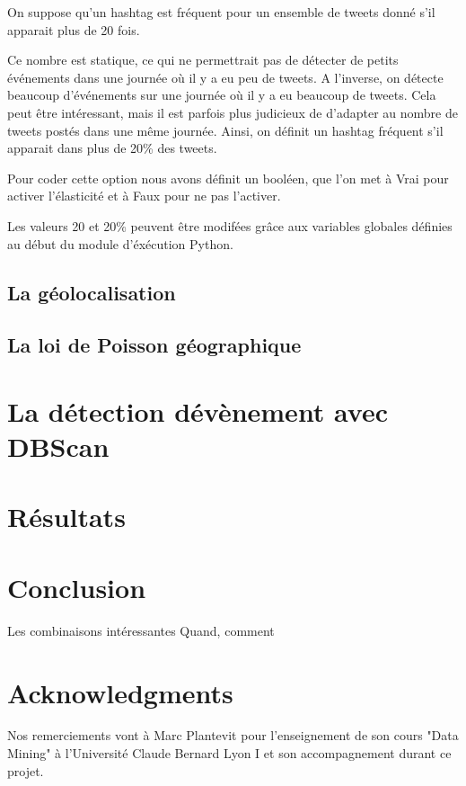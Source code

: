 \documentclass[12pt]{article}
\begin{document}
On suppose qu'un hashtag est fr\'equent pour un ensemble de tweets donn\'e s'il apparait
plus de 20 fois.

Ce nombre est statique, ce qui ne permettrait pas de d\'etecter de petits \'ev\'enements dans
une journ\'ee o\`u il y a eu peu de tweets. A l'inverse, on d\'etecte beaucoup d'\'ev\'enements sur
une journ\'ee o\`u il y a eu beaucoup de tweets.
Cela peut \^etre int\'eressant, mais il est parfois plus judicieux de d'adapter au nombre de
tweets post\'es dans une m\^eme journ\'ee. Ainsi, on d\'efinit un hashtag fr\'equent s'il apparait
dans plus de 20\% des tweets.

Pour coder cette option nous avons d\'efinit un bool\'een, que l'on met \`a Vrai pour activer
l'\'elasticit\'e et \`a Faux pour ne pas l'activer.

Les valeurs 20 et 20\% peuvent \^etre modif\'ees gr\^ace aux variables globales d\'efinies au d\'ebut du
module d'\'ex\'ecution Python.

\subsection{La g\'eolocalisation}


\subsection{La loi de Poisson g\'eographique}


\section{La d\'etection d\'ev\`enement avec DBScan}


\section{R\'esultats}



\section{Conclusion}
Les combinaisons int\'eressantes
\newline
Quand, comment


\section*{Acknowledgments}
Nos remerciements vont \`a Marc Plantevit pour l'enseignement de son cours "Data Mining" \`a l'Universit\'e Claude Bernard Lyon I et son accompagnement durant ce projet.






\appendix
\end{document}
